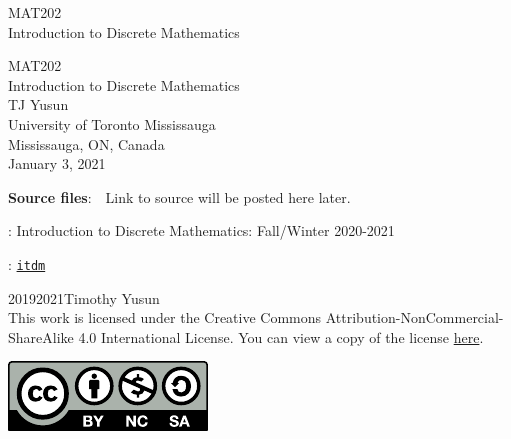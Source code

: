 \documentclass[oneside,10pt,]{book}
\newcommand{\titlepagefont}{\relax}
\newcommand{\mono}[1]{\texttt{#1}}
\numberwithin{equation}{section}
\begin{document}
\frontmatter
\thispagestyle{empty}
{\titlepagefont\centering
\vspace*{0.28\textheight}
{\Huge \sf MAT202 \\[2em] \centering Introduction to Discrete Mathematics \\ }}
\clearpage
\thispagestyle{empty}
\null%
\clearpage
\thispagestyle{empty}
{\titlepagefont\centering
\vspace*{0.14\textheight}
{\Huge \centering \sf MAT202 \\[2em] Introduction to Discrete Mathematics}\\[3\baselineskip]
{\Large TJ Yusun}\\[0.5\baselineskip]
{\Large University of Toronto Mississauga\\
Mississauga, ON, Canada}\\[3\baselineskip]
{\Large January 3, 2021}\\}
\clearpage
\thispagestyle{empty}
\hypertarget{x:colophon:colophon}{}
\par\noindent
\textbf{Source files}:\ \ Link to source will be posted here later. 
\par{}
: Introduction to Discrete Mathematics: Fall\slash{}Winter 2020-2021\par\medskip
{}: \href{https://tjyusun.com/MAT202}{\mono{itdm}}\par\medskip
\noindent\textcopyright{}2019\textendash{}2021\quad{}Timothy Yusun\\[0.5\baselineskip]
This work is licensed under the Creative Commons Attribution-NonCommercial-ShareAlike 4.0 International License. You can view a copy of the license \href{http://creativecommons.org/licenses/by-nc-sa/4.0/}{here}. \begin{image}{0.375}{0.25}{0.375}%
\includegraphics[width=\linewidth]{figs/by-nc-sa}
\end{image}%
\end{document}
